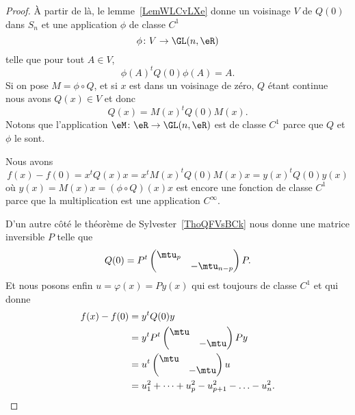 \begin{proof}
    À partir de là, le lemme~\ref{LemWLCvLXe} donne un voisinage \( V\) de \( Q(0)\) dans \( S_n\) et une application \( \phi\) de classe \( C^1\)
    \begin{equation}
            \phi\colon V\to \GL(n,\eR) \\
    \end{equation}
    telle que pour tout \( A\in V\),
    \begin{equation}
        \phi(A)^tQ(0)\phi(A)=A.
    \end{equation}
    Si on pose \( M=\phi\circ Q\), et si \( x\) est dans un voisinage de zéro, \( Q\) étant continue nous avons \( Q(x)\in V\) et donc
    \begin{equation}
        Q(x)=M(x)^tQ(0)M(x).
    \end{equation}
    Notons que l'application \( \eM\colon \eR\to \GL(n,\eR)\) est de classe \( C^1\) parce que \( Q\) et \( \phi\) le sont.

    Nous avons
    \begin{equation}
        f(x)-f(0)=x^tQ(x)x=x^tM(x)^tQ(0)M(x)x=y(x)^tQ(0)y(x)
    \end{equation}
    où \( y(x)=M(x)x=(\phi\circ Q)(x)x\) est encore une fonction de classe \( C^1\) parce que la multiplication est une application \(  C^{\infty}\).

    D'un autre côté le théorème de Sylvester~\ref{ThoQFVsBCk} nous donne une matrice inversible \( P\) telle que
    \begin{equation}
        Q(0)=P^t\begin{pmatrix}
            \mtu_p    &       \\
            &   -\mtu_{n-p}
        \end{pmatrix}P.
    \end{equation}
    Et nous posons enfin \( u=\varphi(x)=Py(x)\) qui est toujours de classe \( C^1\) et qui donne
    \begin{subequations}
        \begin{align}
            f(x)-f(0)&=y^tQ(0)y\\
            &=y^tP^t\begin{pmatrix}
                \mtu    &       \\
                    &   -\mtu
            \end{pmatrix}Py\\
            &=u^t\begin{pmatrix}
                \mtu    &       \\
                    &   -\mtu
            \end{pmatrix}u\\
            &=u_1^2+\cdots +u_p^2-u_{p+1}^2-\ldots -u_n^2.
        \end{align}
    \end{subequations}


\end{proof}
